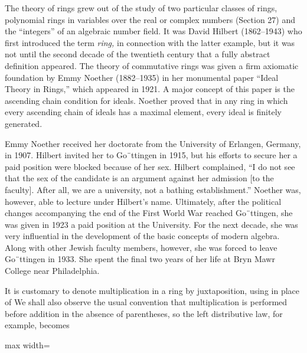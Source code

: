 \documentclass[11pt,oneside]{article}
\begin{document}
\begin{BookBody}


\noindent The theory of rings grew out of the study of two particular classes of rings, polynomial rings in  variables over the real or complex numbers (Section 27) and the “integers” of an algebraic number field. It was David Hilbert (1862–1943) who first introduced the term\textit{ ring,} in connection with the latter example, but it was not until the second decade of the twentieth century that a fully abstract definition appeared. The theory of commutative rings was given a firm axiomatic foundation by Emmy Noether (1882–1935) in her monumental paper “Ideal Theory in Rings,” which appeared in 1921. A major concept of this paper is the ascending chain condition for ideals. Noether proved that in any ring in which every ascending chain of ideals has a maximal element, every ideal is finitely generated.

Emmy Noether received her doctorate from the University of Erlangen, Germany, in 1907. Hilbert invited her to Go¨ttingen in 1915, but his efforts to secure her a paid position were blocked because of her sex. Hilbert complained, “I do not see that the sex of the candidate is an argument against her admission [to the faculty]. After all, we are a university, not a bathing establishment.” Noether was, however, able to lecture under Hilbert’s name. Ultimately, after the political changes accompanying the end of the First World War reached Go¨ttingen, she was given in 1923 a paid position at the University. For the next decade, she was very influential in the development of the basic concepts of modern algebra. Along with other Jewish faculty members, however, she was forced to leave Go¨ttingen in 1933. She spent the final two years of her life at Bryn Mawr College near Philadelphia.

It is customary to denote multiplication in a ring by juxtaposition, using  in place of  We shall also observe the usual convention that multiplication is performed before addition in the absence of parentheses, so the left distributive law, for example, becomes

\begin{center}\begin{adjustbox}{max width=\linewidth}\end{adjustbox}\end{center}


\end{BookBody}
\end{document}
